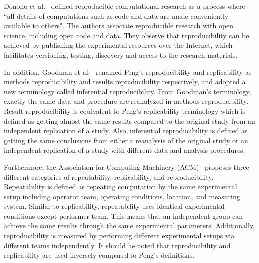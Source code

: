 Donoho et al.~\cite{donoho2009reproducible} defined reproducible 
computational research as a process where ``all details of 
computations such as code and data are made conveniently available to 
others". The authors associate reproducible research with open science,
including open code and data. They observe that 
reproducibility can be achieved by publishing the experimental 
resources over the Internet, which facilitates versioning, testing, 
discovery and access to the research materials. 

In addition, Goodman et al.~\cite{goodman2016does} renamed Peng's 
reproducibility and replicability as methods 
reproducibility and results reproducibility respectively, and adopted a 
new terminology called inferential reproducibility.
From Goodman's terminology, exactly the same data and procedure are 
reanalyzed in methods reproducibility. Result reproducibility is 
equivalent to Peng's replicability terminology which is defined as 
getting almost the same results compared to the original study from an 
independent replication of a study. Also, inferential reproducibility 
is defined as getting the same conclusions from either a reanalysis of 
the original study or an independent replication of a study with 
different data and analysis procedures.
 
Furthermore, the Association for Computing Machinery 
(ACM)~\cite{acm2016terminology} proposes three different categories of 
repeatability, replicability, and reproducibility. Repeatability is 
defined as repeating computation by the same experimental setup 
including operator team, operating conditions, location, and measuring 
system. 
Similar to replicability, repeatability uses identical experimental 
conditions except performer team.
This means that an independent group can achieve the 
same results through the same experimental parameters. 
Additionally, reproducibility is measured by performing 
different experimental setups via different teams 
independently. It should be noted that reproducibility and 
replicability are used inversely compared to Peng's definitions. 


